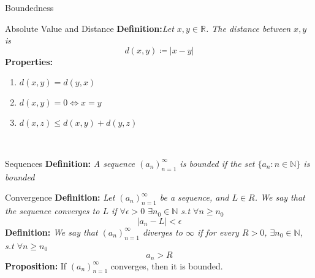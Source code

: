 \documentclass{article}
\begin{document}
\begin{multicols*}{3}
\begin{blackbox}{Boundedness}
\begin{pinkbox}{Absolute Value and Distance}
    \textbf{Definition:}\textit{Let $x,y \in \mathbb{R}$. The distance between $x,y$ is}
    \[d(x,y) \coloneqq |x-y|\]
    \textbf{Properties:}
    \begin{enumerate}[label=(\roman*)]
        \item $d(x,y) = d(y,x)$
        \item $d(x,y) = 0 \iff x = y$
        \item $d(x,z) \leq d(x,y) + d(y,z)$
    \end{enumerate}
\end{pinkbox}\\[-4ex]
\end{blackbox}
\begin{blackbox}{Sequences}
\textbf{Definition:} \textit{A sequence $(a_n)_{n=1}^\infty$ is \emph{bounded} if the set $\{a_n : n \in \mathbb{N}\}$ is bounded}\\[0.2ex]
\begin{brownbox}{Convergence}
\textbf{Definition:} \textit{Let $(a_n)_{n=1}^\infty$ be a sequence, and $L \in R$. We say that the sequence converges to $L$ if $\forall \epsilon > 0$ $\exists n_0 \in \mathbb{N}$ s.t $\forall n\geq n_0$}
\[|a_n -L| < \epsilon\]
\textbf{Definition:} \textit{ We say that $(a_n)_{n=1}^\infty$ diverges to $\infty$ if for every $R > 0$, $\exists n_0 \in \mathbb{N}$, s.t $\forall n \geq n_0$}
\[a_n > R\]
\textbf{Proposition:} If $(a_n)_{n=1}^\infty$ converges, then it is bounded.
\end{brownbox}\\[-0.2ex]
\end{blackbox}


\end{multicols*}
\end{document}
